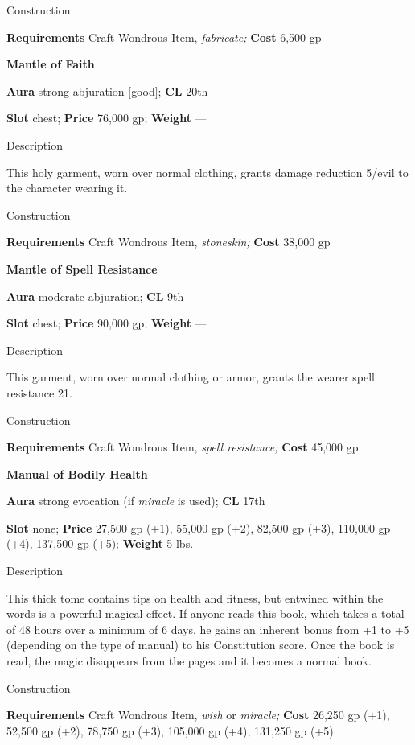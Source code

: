 Construction
				
\textbf{Requirements} Craft Wondrous Item,\textit{ fabricate;}\textbf{ Cost }6,500 gp
				
\textbf{Mantle of Faith}
				
\textbf{Aura} strong abjuration \mbox{$[$}good\mbox{$]$};\textbf{ CL }20th
				
\textbf{Slot} chest; \textbf{Price} 76,000 gp; \textbf{Weight }---
				
Description
				
This holy garment, worn over normal clothing, grants damage reduction 5/evil to the character wearing it. 
				
Construction
				
\textbf{Requirements} Craft Wondrous Item,\textit{ stoneskin;}\textbf{ Cost }38,000 gp
				
\textbf{Mantle of Spell Resistance}
				
\textbf{Aura} moderate abjuration;\textbf{ CL }9th
				
\textbf{Slot} chest; \textbf{Price} 90,000 gp; \textbf{Weight }---
				
Description
				
This garment, worn over normal clothing or armor, grants the wearer spell resistance 21. 
				
Construction
				
\textbf{Requirements} Craft Wondrous Item,\textit{ spell resistance;}\textbf{ Cost }45,000 gp
				
\textbf{Manual of Bodily Health}
				
\textbf{Aura} strong evocation (if \textit{miracle} is used);\textbf{ CL }17th
				
\textbf{Slot} none; \textbf{Price} 27,500 gp (+1), 55,000 gp (+2), 82,500 gp (+3), 110,000 gp (+4), 137,500 gp (+5); \textbf{Weight} 5 lbs.
				
Description
				
This thick tome contains tips on health and fitness, but entwined within the words is a powerful magical effect. If anyone reads this book, which takes a total of 48 hours over a minimum of 6 days, he gains an inherent bonus from +1 to +5 (depending on the type of manual) to his Constitution score. Once the book is read, the magic disappears from the pages and it becomes a normal book. 
				
Construction
				
\textbf{Requirements} Craft Wondrous Item,\textit{ wish} or\textit{ miracle; }\textbf{Cost }26,250 gp (+1), 52,500 gp (+2), 78,750 gp (+3), 105,000 gp (+4), 131,250 gp (+5)
				
